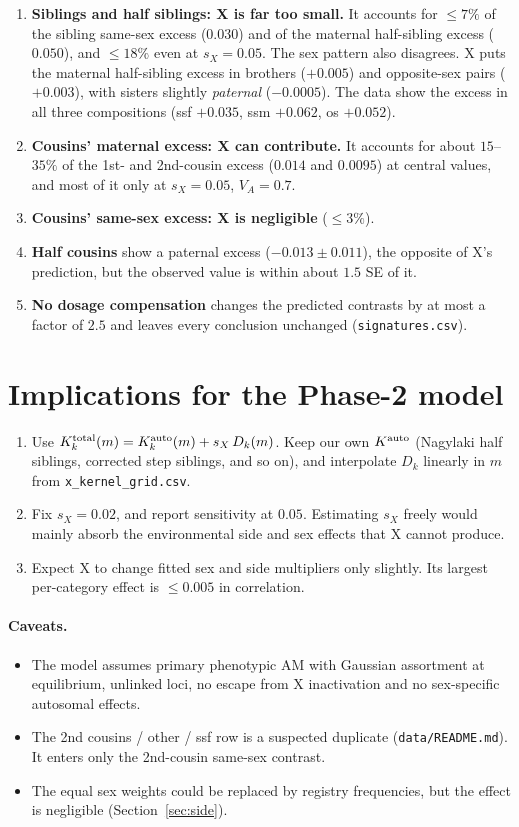 \documentclass[11pt]{article}
\newcommand{\Ka}{K^{\rm auto}}
\begin{document}
\begin{enumerate}
  \item \textbf{Siblings and half siblings: X is far too small.} It accounts for $\le7\%$ of the sibling
    same-sex excess ($0.030$) and of the maternal half-sibling excess ($0.050$), and $\le18\%$ even at
    $s_X=0.05$. The sex pattern also disagrees. X puts the maternal half-sibling excess in brothers ($+0.005$)
    and opposite-sex pairs ($+0.003$), with sisters slightly \emph{paternal} ($-0.0005$). The data show the
    excess in all three compositions (ssf $+0.035$, ssm $+0.062$, os $+0.052$).
  \item \textbf{Cousins' maternal excess: X can contribute.} It accounts for about $15$--$35\%$ of the 1st- and
    2nd-cousin excess ($0.014$ and $0.0095$) at central values, and most of it only at $s_X=0.05$, $V_A=0.7$.
  \item \textbf{Cousins' same-sex excess: X is negligible} ($\le3\%$).
  \item \textbf{Half cousins} show a paternal excess ($-0.013\pm0.011$), the opposite of X's prediction, but
    the observed value is within about $1.5$ SE of it.
  \item \textbf{No dosage compensation} changes the predicted contrasts by at most a factor of $2.5$ and leaves
    every conclusion unchanged (\texttt{signatures.csv}).
\end{enumerate}

\section{Implications for the Phase-2 model}
\begin{enumerate}
  \item Use $K^{\rm total}_k(m)=\Ka_k(m)+s_X\,D_k(m)$. Keep our own $\Ka$ (Nagylaki half siblings, corrected
    step siblings, and so on), and interpolate $D_k$ linearly in $m$ from \texttt{x\_kernel\_grid.csv}.
  \item Fix $s_X=0.02$, and report sensitivity at $0.05$. Estimating $s_X$ freely would mainly absorb the
    environmental side and sex effects that X cannot produce.
  \item Expect X to change fitted sex and side multipliers only slightly. Its largest per-category effect is
    $\le0.005$ in correlation.
\end{enumerate}

\paragraph{Caveats.}
\begin{itemize}
  \item The model assumes primary phenotypic AM with Gaussian assortment at equilibrium, unlinked loci, no
    escape from X inactivation and no sex-specific autosomal effects.
  \item The 2nd cousins / other / ssf row is a suspected duplicate (\texttt{data/README.md}). It enters only
    the 2nd-cousin same-sex contrast.
  \item The equal sex weights could be replaced by registry frequencies, but the effect is negligible
    (Section~\ref{sec:side}).
\end{itemize}
\end{document}
